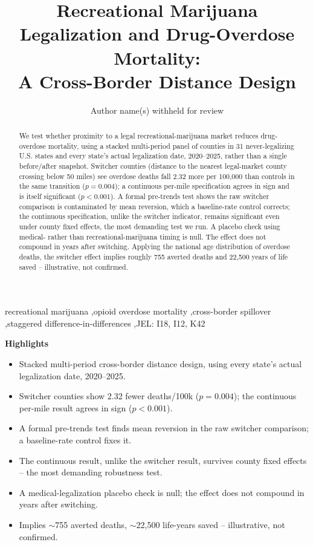 \documentclass[preprint,12pt,authoryear]{elsarticle}
\begin{document}
\begin{frontmatter}

\title{Recreational Marijuana Legalization and Drug-Overdose Mortality:\\
A Cross-Border Distance Design}

\author{Author name(s) withheld for review}

\begin{abstract}
\noindent We test whether proximity to a legal recreational-marijuana
market reduces drug-overdose mortality, using a stacked multi-period
panel of counties in 31 never-legalizing U.S. states and every state's
actual legalization date, 2020--2025, rather than a single
before/after snapshot. Switcher counties (distance to the nearest
legal-market county crossing below 50 miles) see overdose deaths fall
2.32 more per 100,000 than controls in the same transition
($p=0.004$); a continuous per-mile specification agrees in sign and is
itself significant ($p<0.001$). A formal pre-trends test shows the raw
switcher comparison is contaminated by mean reversion, which a
baseline-rate control corrects; the continuous specification, unlike
the switcher indicator, remains significant even under county fixed
effects, the most demanding test we run. A placebo check using
medical- rather than recreational-marijuana timing is null. The effect
does not compound in years after switching. Applying the national age
distribution of overdose deaths, the switcher effect implies roughly
755 averted deaths and 22,500 years of life saved -- illustrative, not
confirmed.
\end{abstract}

\begin{keyword}
recreational marijuana \sep opioid overdose mortality \sep cross-border spillover \sep staggered difference-in-differences \sep JEL: I18, I12, K42
\end{keyword}

\end{frontmatter}

\vspace{0.3cm}
\noindent\textbf{Highlights}
\begin{itemize}[leftmargin=1.4em]
\item Stacked multi-period cross-border distance design, using every state's actual legalization date, 2020--2025.
\item Switcher counties show 2.32 fewer deaths/100k ($p{=}0.004$); the continuous per-mile result agrees in sign ($p{<}0.001$).
\item A formal pre-trends test finds mean reversion in the raw switcher comparison; a baseline-rate control fixes it.
\item The continuous result, unlike the switcher result, survives county fixed effects -- the most demanding robustness test.
\item A medical-legalization placebo check is null; the effect does not compound in years after switching.
\item Implies $\sim$755 averted deaths, $\sim$22,500 life-years saved -- illustrative, not confirmed.
\end{itemize}
\end{document}
